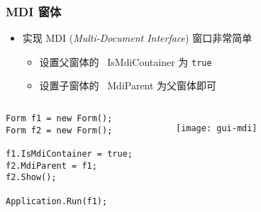
\begin{frame}[fragile]
\frametitle{MDI 窗体}
\begin{itemize}
\item 实现 MDI (\textit{Multi-Document Interface}) 窗口非常简单
  \begin{itemize}
  \item 设置父窗体的 ~IsMdiContainer 为 \texttt{true}
  \item 设置子窗体的 ~MdiParent 为父窗体即可
  \end{itemize}
\end{itemize}
\begin{columns}
\begin{lstlisting}
Form f1 = new Form();
Form f2 = new Form();

f1.IsMdiContainer = true;
f2.MdiParent = f1;
f2.Show();

Application.Run(f1);
\end{lstlisting}
  \begin{figure}[htbp]
    \centering
    \texttt{[image: gui-mdi]}
  \end{figure}
\end{columns}
\end{frame}

